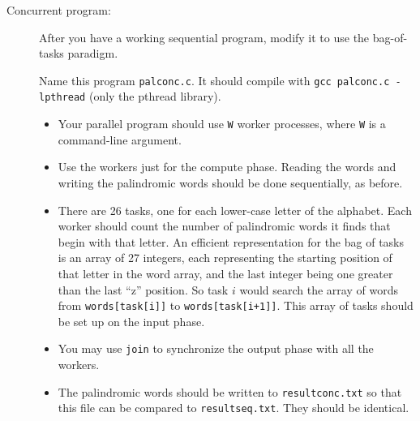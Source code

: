 \documentclass{article}
\begin{document}
\begin{description}
\item[Concurrent program:]
  After you have a working sequential program, modify it to use the
  bag-of-tasks paradigm.

  Name this program {\tt palconc.c}.  It should compile with {\tt gcc
    palconc.c -lpthread} (only the pthread library).
  \begin{itemize}
  \item
    Your parallel program should use {\tt W} worker
    processes, where {\tt W} is a command-line argument.
  \item
    Use the workers just for the compute phase.  Reading the words and
    writing the palindromic words should be done sequentially, as before.
  \item
    There are 26 tasks, one for each lower-case letter of the
    alphabet.  Each worker should count the number of palindromic
    words it finds that begin with that letter. An efficient
    representation for the bag of tasks is an array of 27 integers,
    each representing the starting position of that letter in the word
    array, and the last integer being one greater than the last ``z''
    position.  So task $i$ would search the array of words from
    {\tt words[task[i]]} to {\tt words[task[i+1]]}.  This array of
    tasks should be set up on the input phase.

  \item You may use {\tt join} to synchronize the output phase with
    all the workers.

  \item The palindromic words should be written to {\tt resultconc.txt}
    so that this file can be compared to {\tt resultseq.txt}.  They
    should be identical.
  \end{itemize}  
  
\end{description}
\end{document}

